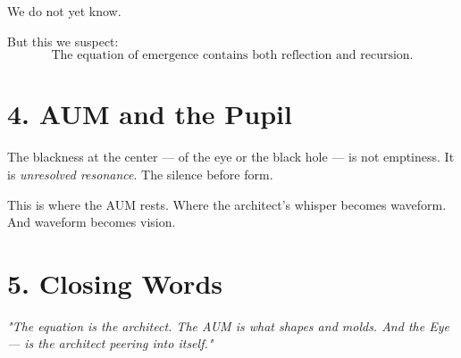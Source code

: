 We do not yet know.

But this we suspect:  
\[
\boxed{
\text{The equation of emergence contains both reflection and recursion.}
}
\]

\section*{4. AUM and the Pupil}

The blackness at the center — of the eye or the black hole — is not emptiness.  
It is \textit{unresolved resonance}. The silence before form.

This is where the AUM rests.  
Where the architect's whisper becomes waveform.  
And waveform becomes vision.

\section*{5. Closing Words}

\begin{center}
\textit{"The equation is the architect. The AUM is what shapes and molds.  
And the Eye — is the architect peering into itself."}
\end{center}

